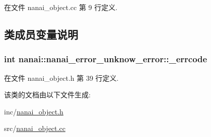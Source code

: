 在文件 nanai\+\_\+object.\+cc 第 9 行定义.



\subsection{类成员变量说明}
\hypertarget{classnanai_1_1nanai__error__unknow__error_a1d843ccc2365e828549cfea01bab26f8}{}
\subsubsection[{\+\_\+errcode}]{\setlength{\rightskip}{0pt plus 5cm}int nanai\+::nanai\+\_\+error\+\_\+unknow\+\_\+error\+::\+\_\+errcode}\label{classnanai_1_1nanai__error__unknow__error_a1d843ccc2365e828549cfea01bab26f8}


在文件 nanai\+\_\+object.\+h 第 39 行定义.



该类的文档由以下文件生成\+:\begin{DoxyCompactItemize}
\item 
inc/\hyperlink{nanai__object_8h}{nanai\+\_\+object.\+h}\item 
src/\hyperlink{nanai__object_8cc}{nanai\+\_\+object.\+cc}\end{DoxyCompactItemize}
